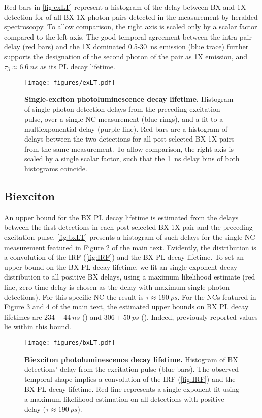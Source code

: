 \documentclass[journal=nalefd, manuscript=letter, layout=twocolumn]{achemso}
\begin{document}
Red bars in \autoref{fig:exLT} represent a histogram of the delay between BX and 1X detection for of all BX-1X photon pairs detected in the measurement by heralded spectroscopy. To allow comparison, the right axis is scaled only by a scalar factor compared to the left axis. The good temporal agreement between the intra-pair delay (red bars) and the 1X dominated 0.5-\SI{30}{ns} emission (blue trace) further supports the designation of the second photon of the pair as 1X emission, and $\tau_3\approx \SI{6.6}{ns}$ as its PL decay lifetime.

\begin{figure}
    \centering
    \texttt{[image: figures/exLT.pdf]}
    \caption{\textbf{Single-exciton photoluminescence decay lifetime.} Histogram of single-photon detection delays from the preceding excitation pulse, over a single-NC measurement (blue rings), and a fit to a multiexponential delay (purple line). Red bars are a histogram of delays between the two detections for all post-selected BX-1X pairs from the same measurement. To allow comparison, the right axis is scaled by a single scalar factor, such that the \SI{1}{ns} delay bins of both histograms coincide.}
    \label{fig:exLT}
\end{figure}

\subsection{Biexciton}
An upper bound for the BX PL decay lifetime is estimated from the delays between the first detections in each post-selected BX-1X pair and the preceding excitation pulse. \autoref{fig:bxLT} presents a histogram of such delays for the single-NC measurement featured in Figure 2 of the main text. Evidently, the distribution is a convolution of the IRF (\autoref{fig:IRF}) and the BX PL decay lifetime. To set an upper bound on the BX PL decay lifetime, we fit an single-exponent decay distribution to all positive BX delays, using a maximum likelihood estimate (red line, zero time delay is chosen as the delay with maximum single-photon detections). For this specific NC the result is $\tau \approx \SI{190}{ps}$. For the NCs featured in Figure 3 and 4 of the main text, the estimated upper bounds on BX PL decay lifetimes are $234\pm\SI{44}{ns}$ () and $306\pm\SI{50}{ps}$ (). Indeed, previously reported values lie within this bound\cite{Castaneda2016,DeJong2017,Ashner2019}.
\begin{figure}
    \centering
    \texttt{[image: figures/bxLT.pdf]}
    \caption{\textbf{Biexciton photoluminescence decay lifetime.} Histogram of BX detections' delay from the excitation pulse (blue bars). The observed temporal shape implies a convolution of the IRF (\autoref{fig:IRF}) and the BX PL decay lifetime. Red line represents a single-exponent fit using a maximum likelihood estimation on all detections with positive delay ($\tau \approx \SI{190}{ps}$).}
    \label{fig:bxLT}
\end{figure}
\end{document}
